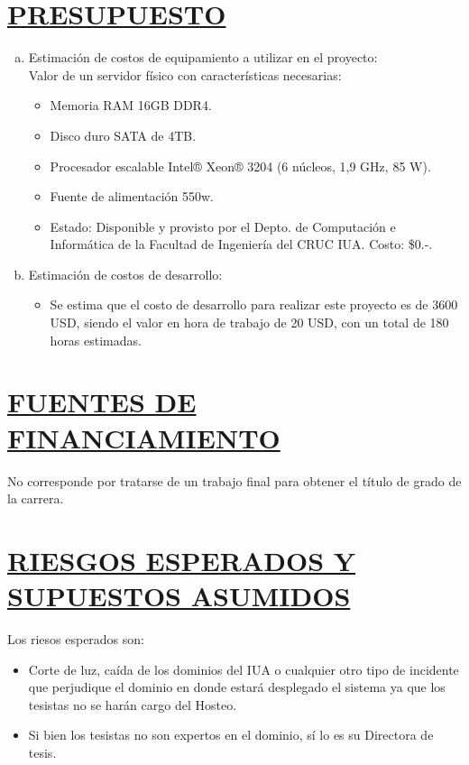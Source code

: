 \section*{\underline{PRESUPUESTO}}
\begin{enumerate}[(a)]
	\item Estimación de costos de equipamiento a utilizar en el proyecto:\\
Valor de un servidor físico con características necesarias:

		\begin{itemize}
			\item Memoria RAM 16GB DDR4.
			\item Disco duro SATA de 4TB.
			\item Procesador escalable Intel® Xeon® 3204 (6 núcleos, 1,9 GHz, 85 W).
			\item Fuente de alimentación 550w.
			\item Estado: Disponible y provisto por el Depto. de Computación e Informática de la Facultad de Ingeniería del CRUC IUA. Costo: \$0.-.
		\end{itemize}

	\item Estimación de costos de desarrollo:
		\begin{itemize}
			\item Se estima que el costo de desarrollo para realizar este proyecto es de 3600 USD, siendo el valor en hora de trabajo de 20 USD, con un total de 180 horas estimadas.\\
		\end{itemize}
\end{enumerate}

\section*{\underline{FUENTES DE FINANCIAMIENTO}}
No corresponde por tratarse de un trabajo final para obtener el título de grado de la carrera.\\

\section*{\underline{RIESGOS ESPERADOS Y SUPUESTOS ASUMIDOS}}
Los riesos esperados son:
\begin{itemize}
	\item Corte de luz, caída de los dominios del IUA o cualquier otro tipo de incidente que perjudique el dominio en donde estará desplegado el sistema ya que los tesistas no se harán cargo del Hosteo.
	\item Si bien los tesistas no son expertos en el dominio, sí lo es su Directora de tesis.\\
\end{itemize}


